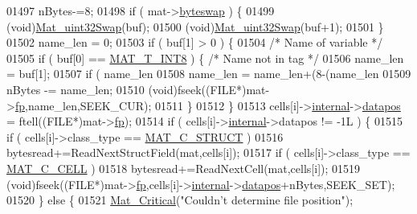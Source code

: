 \begin{DoxyCode}
{{{{{{{{{{{01497             nBytes-=8;
01498             \textcolor{keywordflow}{if} ( mat->\hyperlink{struct__mat__t_a99d207977af5e04941ace56d71817a40}{byteswap} ) \{
01499                 (void)\hyperlink{endian_8c_a8cb0d0750e2eaf9840d95db531934f4f}{Mat\_uint32Swap}(buf);
01500                 (void)\hyperlink{endian_8c_a8cb0d0750e2eaf9840d95db531934f4f}{Mat\_uint32Swap}(buf+1);
01501             \}
01502             name\_len = 0;
01503             \textcolor{keywordflow}{if} ( buf[1] > 0 ) \{
01504                 \textcolor{comment}{/* Name of variable */}
01505                 \textcolor{keywordflow}{if} ( buf[0] == \hyperlink{group___m_a_t_ggacf7b3b879282b7ab3a51190e49bf3453a9807f5033ed4f9b548953742d9fd1658}{MAT\_T\_INT8} ) \{    \textcolor{comment}{/* Name not in tag */}
01506                     name\_len = buf[1];
01507                     \textcolor{keywordflow}{if} ( name\_len %
01508                         name\_len = name\_len+(8-(name\_len %
01509                     nBytes -= name\_len;
01510                     (void)fseek((FILE*)mat->\hyperlink{struct__mat__t_a85f562e407ca9ad4d2a6e14f839432b7}{fp},name\_len,SEEK\_CUR);
01511                 \}
01512             \}
01513             cells[i]->\hyperlink{group___m_a_t_a6e97e3ed9f40c49322c18561c2a94e92}{internal}->\hyperlink{structmatvar__internal_afd3bfaab126a160bd6855563e1ea0a7e}{datapos} = ftell((FILE*)mat->\hyperlink{struct__mat__t_a85f562e407ca9ad4d2a6e14f839432b7}{fp});
01514             \textcolor{keywordflow}{if} ( cells[i]->\hyperlink{namespaceinternal}{internal}->datapos != -1L ) \{
01515                 \textcolor{keywordflow}{if} ( cells[i]->class\_type == \hyperlink{group___m_a_t_ggad4d60ae7b709fc81bfd744fb4c857c40acb467c7749c80902b798134c729bb521}{MAT\_C\_STRUCT} )
01516                     bytesread+=ReadNextStructField(mat,cells[i]);
01517                 \textcolor{keywordflow}{if} ( cells[i]->class\_type == \hyperlink{group___m_a_t_ggad4d60ae7b709fc81bfd744fb4c857c40a2f7abb47a1c51e248bd4e5e03cc81b08}{MAT\_C\_CELL} )
01518                     bytesread+=ReadNextCell(mat,cells[i]);
01519                 (void)fseek((FILE*)mat->\hyperlink{struct__mat__t_a85f562e407ca9ad4d2a6e14f839432b7}{fp},cells[i]->\hyperlink{group___m_a_t_a6e97e3ed9f40c49322c18561c2a94e92}{internal}->\hyperlink{structmatvar__internal_afd3bfaab126a160bd6855563e1ea0a7e}{datapos}+nBytes,SEEK\_SET);
01520             \} \textcolor{keywordflow}{else} \{
01521                 \hyperlink{group__mat__util_gaf51f2bfbb5580f575e4dd79757e2b80c}{Mat\_Critical}(\textcolor{stringliteral}{"Couldn't determine file position"});
}}}}}}}}}}}
\end{DoxyCode}
